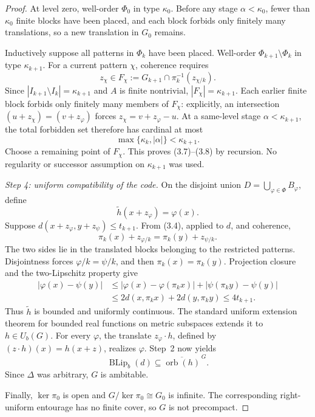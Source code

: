 \documentclass[11pt]{article}
\newcommand{\BLip}{\operatorname{BLip}_b}
\newcommand{\orb}{\operatorname{orb}}
\newcommand{\Ub}{U_b}
\begin{document}
\begin{proof}
At level zero, well-order $\Phi_0$ in type $\kappa_0$.  Before any stage
$\alpha<\kappa_0$, fewer than $\kappa_0$ finite blocks have been placed, and
each block forbids only finitely many translations, so a new translation in
$G_0$ remains.

Inductively suppose all patterns in $\Phi_k$ have been placed.  Well-order
$\Phi_{k+1}\setminus\Phi_k$ in type $\kappa_{k+1}$.  For a current pattern
$\chi$, coherence requires
\[
 z_\chi\in F_\chi:=G_{k+1}\cap
 \pi_k^{-1}(z_{\chi/k}).                              \tag{3.9}
\]
Since $|I_{k+1}\setminus I_k|=\kappa_{k+1}$ and $A$ is finite nontrivial,
$|F_\chi|=\kappa_{k+1}$.  Each earlier finite block forbids only finitely many
members of $F_\chi$: explicitly, an intersection
$(u+z_\chi)=(v+z_\varphi)$ forces
$z_\chi=v+z_\varphi-u$.  At a same-level stage
$\alpha<\kappa_{k+1}$, the total forbidden set therefore has cardinal at most
\[
 \max\{\kappa_k,|\alpha|\}<\kappa_{k+1}.              \tag{3.10}
\]
Choose a remaining point of $F_\chi$.  This proves (3.7)--(3.8) by recursion.
No regularity or successor assumption on $\kappa_{k+1}$ was used.

\smallskip\noindent\emph{Step 4: uniform compatibility of the code.}
On the disjoint union $D=\bigcup_{\varphi\in\Phi}B_\varphi$, define
\[
 \widetilde h(x+z_\varphi)=\varphi(x).                \tag{3.11}
\]
Suppose
$d(x+z_\varphi,y+z_\psi)\le t_{k+1}$.  From (3.4), applied to $d$, and
coherence,
\[
 \pi_k(x)+z_{\varphi/k}=\pi_k(y)+z_{\psi/k}.          \tag{3.12}
\]
The two sides lie in the translated blocks belonging to the restricted
patterns.  Disjointness forces $\varphi/k=\psi/k$, and then
$\pi_k(x)=\pi_k(y)$.  Projection closure and the two-Lipschitz property give
\begin{align*}
 |\varphi(x)-\psi(y)|
 &\le |\varphi(x)-\varphi(\pi_kx)|
      +|\psi(\pi_ky)-\psi(y)|\\
 &\le 2d(x,\pi_kx)+2d(y,\pi_ky)
 \le4t_{k+1}.                                        \tag{3.13}
\end{align*}
Thus $\widetilde h$ is bounded and uniformly continuous.  The standard
uniform extension theorem for bounded real functions on metric subspaces
extends it to $h\in\Ub(G)$.  For every $\varphi$, the translate
$z_\varphi\mathbin{\cdot}h$, defined by
$(z\mathbin{\cdot}h)(x)=h(x+z)$, realizes $\varphi$.  Step~2 now yields
\[
 \BLip(d)\subseteq\overline{\orb(h)}^{\,G}.
\]
Since $\Delta$ was arbitrary, $G$ is ambitable.

Finally, $\ker\pi_0$ is open and
$G/\ker\pi_0\cong G_0$ is infinite.  The corresponding right-uniform
entourage has no finite cover, so $G$ is not precompact.
\end{proof}
\end{document}
